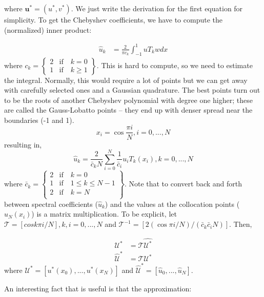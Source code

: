 \documentclass[12pt]{article}
\begin{document}
where $\mathbf{u}^* = (u^*, v^*)$. We just write the derivation for the first equation for simplicity. To get the Chebyshev coefficients, we have to compute the (normalized) inner product:

\begin{align*}
    \hat{u}_k &= \frac{2}{\pi c_k} \int_{-1}^1 u T_k w dx
\end{align*}
where $c_k = \left\{\begin{matrix}
2 &  \text{if} \quad k = 0\\
1 &  \text{if} \quad k \geq 1
\end{matrix}\right\}$. This is hard to compute, so we need to estimate the integral. Normally, this would require a lot of points but we can get away with carefully selected ones and a Gaussian quadrature. The best points turn out to be the roots of another Chebyshev polynomial with degree one higher; these are called the Gauss-Lobatto points -- they end up with denser spread near the boundaries (-1 and 1).
\begin{equation}
    x_i = \cos \frac{\pi i}{N}, i = 0, ..., N
\end{equation}
resulting in,
\begin{equation}
    \hat{u}_k = \frac{2}{\bar{c}_k N} \sum_{i=0}^N \frac{1}{\bar{c}_i} u_i T_k(x_i), k = 0, ..., N
\end{equation}
where $\bar{c}_k = \left\{\begin{matrix}
2 &  \text{if} \quad k = 0 \\
1 &  \text{if} \quad 1 \leq k \leq N - 1 \\
2 &  \text{if} \quad k = N \\
\end{matrix}\right\}$. Note that to convert back and forth between spectral coefficients ($\hat{u}_k$) and the values at the collocation points ($u_N(x_i)$) is a matrix multiplication. To be explicit, let
$\mathcal{T} = [cos k\pi i / N], k, i = 0, ..., N$ and $\mathcal{T}^{-1} = [2(\cos \pi i / N) / (\bar{c}_k \bar{c}_i N)]$. Then,

\begin{align*}
    \mathcal{U}^* &= \mathcal{T}\hat{\mathcal{U}^*} \\
    \hat{\mathcal{U}}^* &= \mathcal{T}\mathcal{U}^*
\end{align*}
where $\mathcal{U}^* = [u^*(x_0), ..., u^*(x_N)]$ and $\hat{\mathcal{U}}^* = [\hat{u}_0, ..., \hat{u}_N]$.

An interesting fact that is useful is that the  approximation:
\end{document}
